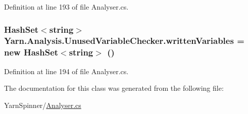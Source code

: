 Definition at line 193 of file Analyser.\-cs.

\hypertarget{a00163_a0c2fe6eded1b10b135ca2469f5980a39}{
\subsubsection[{written\-Variables}]{\setlength{\rightskip}{0pt plus 5cm}Hash\-Set$<$string$>$ Yarn.\-Analysis.\-Unused\-Variable\-Checker.\-written\-Variables = new Hash\-Set$<$string$>$ ()\hspace{0.3cm}{\ttfamily [private]}}}\label{a00163_a0c2fe6eded1b10b135ca2469f5980a39}


Definition at line 194 of file Analyser.\-cs.



The documentation for this class was generated from the following file\-:\begin{DoxyCompactItemize}
\item 
Yarn\-Spinner/\hyperlink{a00279}{Analyser.\-cs}\end{DoxyCompactItemize}
